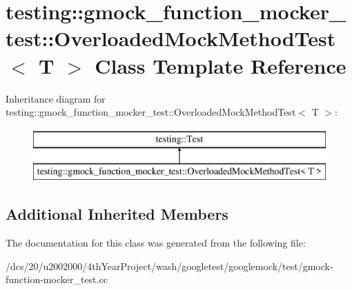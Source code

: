 \hypertarget{classtesting_1_1gmock__function__mocker__test_1_1OverloadedMockMethodTest}{}\section{testing\+:\+:gmock\+\_\+function\+\_\+mocker\+\_\+test\+:\+:Overloaded\+Mock\+Method\+Test$<$ T $>$ Class Template Reference}
\label{classtesting_1_1gmock__function__mocker__test_1_1OverloadedMockMethodTest}
Inheritance diagram for testing\+:\+:gmock\+\_\+function\+\_\+mocker\+\_\+test\+:\+:Overloaded\+Mock\+Method\+Test$<$ T $>$\+:\begin{figure}[H]
\begin{center}
\leavevmode
\includegraphics[height=2.000000cm]{classtesting_1_1gmock__function__mocker__test_1_1OverloadedMockMethodTest}
\end{center}
\end{figure}
\subsection*{Additional Inherited Members}


The documentation for this class was generated from the following file\+:\begin{DoxyCompactItemize}
\item 
/dcs/20/u2002000/4th\+Year\+Project/wash/googletest/googlemock/test/gmock-\/function-\/mocker\+\_\+test.\+cc\end{DoxyCompactItemize}

